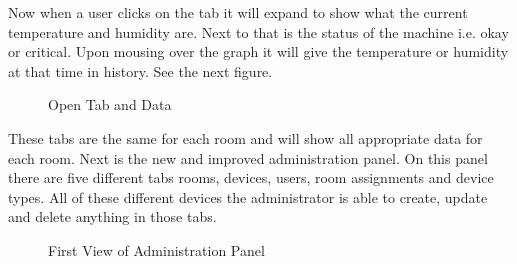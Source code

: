 \documentclass{report}
\begin{document}
Now when a user clicks on the tab it will expand to show what the current temperature and humidity are. Next to that is the status of the machine i.e. okay or critical. Upon mousing over the graph it will give the temperature or humidity at that time in history. See the next figure.
\begin{figure}[H]
	\caption{Open Tab and Data}
\end{figure}
\newpage

These tabs are the same for each room and will show all appropriate data for each room. Next is the new and improved administration panel. 
On this panel there are five different tabs rooms, devices, users, room assignments and device types. All of these different devices the administrator is able to create, update and delete anything in those tabs. 
\begin{figure}[H]
	\caption{First View of Administration Panel}
\end{figure}
\newpage
\end{document}
